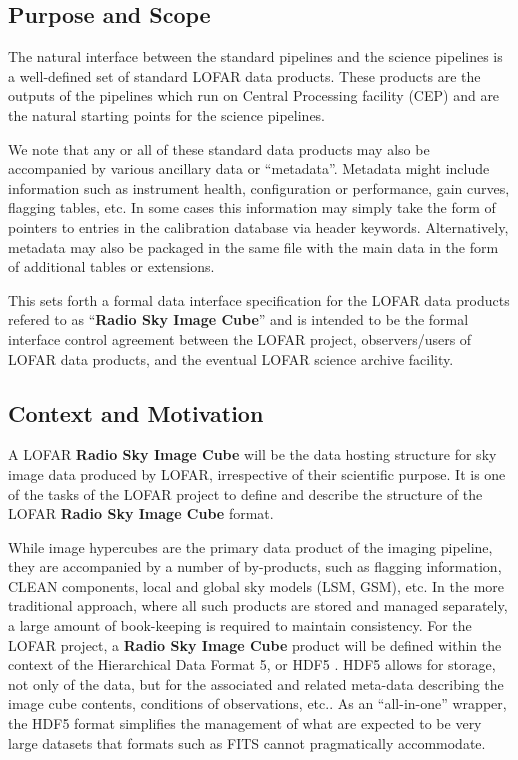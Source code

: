 \documentclass[a4paper,10pt,bibtotoc]{scrartcl}
\begin{document}
\subsection{Purpose and Scope}
\label{sec:purpose and scope}

The natural interface between the standard pipelines and the science pipelines
is a well-defined set of standard LOFAR data products. These products are the
outputs of the pipelines which run on Central Processing facility
(CEP) and are the natural starting points for the science pipelines.

We note that any or all of these standard data products may also be
accompanied by various ancillary data or ``metadata''. Metadata might
include information such as instrument health, configuration or
performance, gain curves, flagging tables, etc. In some cases this
information may simply take the form of pointers to entries in the
calibration database via header keywords. Alternatively, metadata may
also be packaged in the same file with the main data in the form of
additional tables or extensions.

This \icd{} sets forth a formal data interface specification for the
LOFAR data products refered to as ``\textbf{Radio Sky Image Cube}'' and is
intended to be the formal interface control agreement between the
LOFAR project, observers/users of LOFAR data products, and the
eventual LOFAR science archive facility.

\subsection{Context and Motivation}
\label{sec:context and motivation}

A LOFAR \textbf{Radio Sky Image Cube} will be the data hosting structure for
sky image data produced by LOFAR, irrespective of their scientific purpose.
It is one of the tasks of the LOFAR project to define and describe the
structure of the LOFAR \textbf{Radio Sky Image Cube} format.

While image hypercubes are the primary data product of the imaging
pipeline, they are accompanied by a number of by-products, such as
flagging information, CLEAN components, local and global sky models
(LSM, GSM), etc. In the more traditional approach, where all such
products are stored and managed separately, a large amount of
book-keeping is required to maintain consistency. For the LOFAR
project, a \textbf{Radio Sky Image Cube} product will be defined within the context
of the Hierarchical Data Format 5, or HDF5 \cite{hdf5}. HDF5 allows
for storage, not only of the data, but for the associated and related
meta-data describing the image cube contents, conditions of
observations, etc.. As an ``all-in-one'' wrapper, the HDF5 format
simplifies the management of what are expected to be very large
datasets that formats such as FITS cannot pragmatically accommodate.
\end{document}
